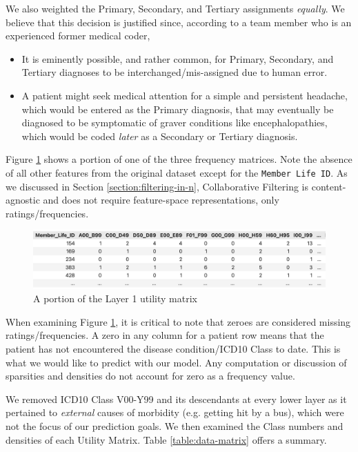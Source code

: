 \documentclass[twoside,11pt]{article}
\begin{document}
{We also weighted the Primary, Secondary, and Tertiary assignments \textit{equally}. We believe that this decision is justified since, according to a team member who is an experienced former medical coder,
\begin{itemize}
  \item It is eminently possible, and rather common, for Primary, Secondary, and Tertiary diagnoses to be interchanged/mis-assigned due to human error.
  \item A patient might seek medical attention for a simple and persistent headache, which would be entered as the Primary diagnosis, that may eventually be diagnosed to be symptomatic of graver conditions like encephalopathies, which would be coded \textit{later} as a Secondary or Tertiary diagnosis.
\end{itemize}

Figure \ref{fig:utility-matrix} shows a portion of one of the three frequency matrices. Note the absence of all other features from the original dataset except for the \texttt{Member Life ID}. As we discussed in Section \ref{section:filtering-in-n}, Collaborative Filtering is content-agnostic and does not require feature-space representations, only ratings/frequencies.

\begin{figure}[H]
	\begin{adjustwidth}{-4em}{}
		\includegraphics[width=1.17\textwidth]{./images/utility-matrix.jpg}
	\end{adjustwidth}
	\caption{A portion of the Layer 1 utility matrix}
	\label{fig:utility-matrix}
\end{figure}

When examining Figure \ref{fig:utility-matrix}, it is critical to note that zeroes are considered missing ratings/frequencies. A zero in any column for a patient row means that the patient has not encountered the disease condition/ICD10 Class to date. This is what we would like to predict with our model. Any computation or discussion of sparsities and densities do not account for zero as a frequency value.

We removed ICD10 Class V00-Y99 and its descendants at every lower layer as it pertained to \textit{external} causes of morbidity (e.g. getting hit by a bus), which were not the focus of our prediction goals. We then examined the Class numbers and densities of each Utility Matrix. Table \ref{table:data-matrix} offers a summary.

}
\end{document}
